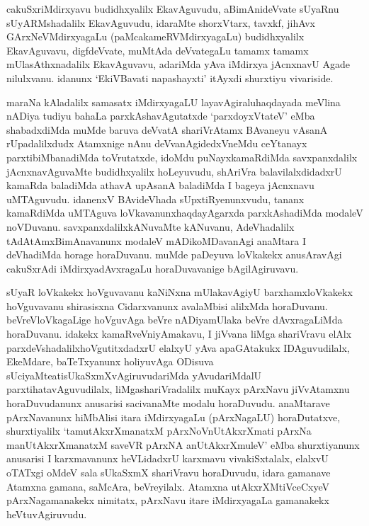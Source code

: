 
\begin{artha}
cakuSxriMdirxyavu budidhxyalilx EkavAguvudu, aBimAnideVvate sUyaRnu sUyARMshadalilx EkavAguvudu, idaraMte shorxVtarx, tavxkf, jihAvx GArxNeVMdirxyagaLu (paMcakameRVMdirxyagaLu) budidhxyalilx EkavAguvavu, digfdeVvate, muMtAda deVvategaLu tamamx tamamx mUlasAthxnadalilx EkavAguvavu, adariMda yAva iMdirxya jAcnxnavU Agade nilulxvanu. idanunx `EkiVBavati napashayxti' itAyxdi shurxtiyu vivariside.
\end{artha}


\begin{artha}
maraNa kAladalilx samasatx iMdirxyagaLU layavAgiralu\break haqdayada meVlina nADiya tudiyu bahaLa parxkAshavAgutatxde `parxdoyxVtateV' eMba shabadxdiMda muMde baruva deVvatA shariVrAtamx BAvaneyu vAsanA rUpadalilxdudx Atamxnige nAnu deVvanAgidedxVneMdu ceYtanayx parxtibiMbanadiMda toVrutatxde, idoMdu puNayxkamaRdiMda savxpanxdalilx jAcnxnavAguvaMte budidhxyalilx hoLeyuvudu, shAriVra balavilalxdidadxrU kamaRda baladiMda athavA upAsanA baladiMda I bageya jAcnxnavu uMTAguvudu. idanenxV BAvideVhada sUpxtiRyenunxvudu, tananx kamaRdiMda uMTAguva loVkavanunx\break haqdayAgarxda parxkAshadiMda modaleV noVDuvanu. savxpanxdalilx\break kANuvaMte kANuvanu, AdeVhadalilx tAdAtAmxBimAnavanunx modaleV mADikoMDavanAgi anaMtara I deVhadiMda horage horaDuvanu. muMde paDeyuva loVkakekx anusAravAgi cakuSxrAdi iMdirxyadAvxragaLu horaDuvavanige bAgilAgiruvavu. 
\end{artha}%

\begin{artha}
sUyaR loVkakekx hoVguvavanu kaNiNxna mUlakavAgiyU barxhamxloVkakekx hoVguvavanu shirasisxna Cidarxvanunx avalaMbisi alilxMda horaDuvanu. beVreVloVkagaLige hoVguvAga beVre nADiya\break mUlaka beVre dAvxragaLiMda horaDuvanu. idakekx kamaRveV\break niyAmakavu, I jiVvana liMga shariVravu elAlx parxdeVshadalilx\break hoVgutitxdadxrU elalxyU yAva apaGAtakukx IDAguvudilalx, EkeMdare, baTeTxyanunx holiyuvAga ODisuva sUciyaMte\break atisUkaSxmXvAgiruvudariMda yAvudariMdalU parxtihatavAguvudilalx, liMgashariVradalilx muKayx pArxNavu jiVvAtamxnu horaDuvudanunx anusarisi sacivanaMte modalu horaDuvudu. anaMtarave pArxNavanunx hiMbAlisi itara iMdirxyagaLu (pArxNagaLU) horaDutatxve, shurxtiyalilx `tamutAkxrXmanatxM pArxNoV\s nUtAkxrXmati pArxNa manUtAkxrXmanatxM saveVR pArxNA anUtAkxrXmuleV' eMba shurxtiyanunx anusarisi I karxmavanunx heVLidadxrU karxmavu vivakiSxtalalx, elalxvU oTATxgi oMdeV sala sUkaSxmX shariVravu horaDuvudu, idara gamanave Atamxna gamana, saMcAra, beVreyilalx. Atamxna utAkxrXMtiVceCxyeV pArxNagamanakekx nimitatx, pArxNavu itare iMdirxyagaLa gamanakekx heVtuvAgiruvudu.
\end{artha}

